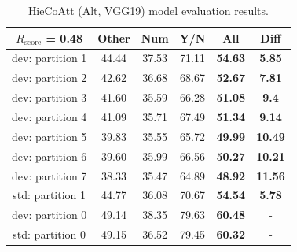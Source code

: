 \documentclass[letterpaper]{article}
\newcommand{\rscore}{}\def\rscore/{$R_{\text{score}}$}
\begin{document}
\begin{table}
\begin{subtable}{0.49\linewidth}
		\begin{adjustbox}{width=0.46\columnwidth}
\begin{tabular}{c | c c c c | c}
			\rscore/ = \textbf{0.48} & Other & Num   & Y/N   & All            & Diff           \\ [0.5ex]
			\hline
			dev: partition 1         & 44.44 & 37.53 & 71.11 & \textbf{54.63} & \textbf{5.85}  \\
			dev: partition 2         & 42.62 & 36.68 & 68.67 & \textbf{52.67} & \textbf{7.81}  \\
			dev: partition 3         & 41.60 & 35.59 & 66.28 & \textbf{51.08} & \textbf{9.4}   \\
			dev: partition 4         & 41.09 & 35.71 & 67.49 & \textbf{51.34} & \textbf{9.14}  \\
			dev: partition 5         & 39.83 & 35.55 & 65.72 & \textbf{49.99} & \textbf{10.49} \\
			dev: partition 6         & 39.60 & 35.99 & 66.56 & \textbf{50.27} & \textbf{10.21} \\
			dev: partition 7         & 38.33 & 35.47 & 64.89 & \textbf{48.92} & \textbf{11.56} \\
			\hline
			std: partition 1         & 44.77 & 36.08 & 70.67 & \textbf{54.54} & \textbf{5.78}  \\
			\hline
			dev: partition 0         & 49.14 & 38.35 & 79.63 & \textbf{60.48} & -              \\
			std: partition 0         & 49.15 & 36.52 & 79.45 & \textbf{60.32} & -              \\
			\hline
		\end{tabular}
\end{adjustbox}
		\caption{HieCoAtt (Alt, VGG19) model evaluation results.}


\end{subtable}
\end{table}
\end{document}
